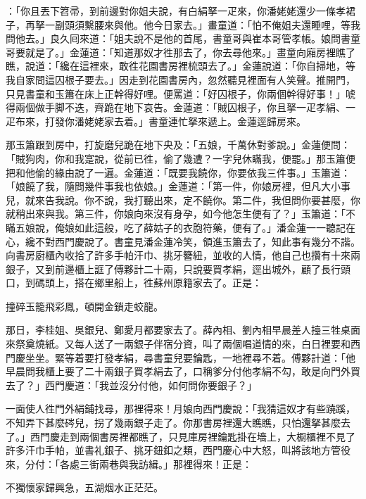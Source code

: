 ：「你且丟下笤帚，到前邊對你姐夫說，有白絹拏一疋來，你潘姥姥還少一條孝裙子，再拏一副頭須繫腰來與他。他今日家去。」畫童道：「怕不俺姐夫還睡哩，等我問他去。」良久囘來道：「姐夫說不是他的首尾，書童哥與崔本哥管孝帳。娘問書童哥要就是了。」金蓮道：「知道那奴才徃那去了，你去尋他來。」畫童向廂房裡瞧了瞧，{}說道：「纔在這裡來，敢徃花園書房裡梳頭去了。」金蓮說道：「你自掃地，等我自家問這囚根子要去。」因走到花園書房內，忽然聽見裡面有人笑聲。推開門，只見書童和玉簫在床上正幹得好哩。便罵道：「好囚根子，你兩個幹得好事！」唬得兩個做手脚不迭，齊跪在地下哀告。金蓮道：「賊囚根子，你且拏一疋孝絹、一疋布來，打發你潘姥姥家去着。」書童連忙拏來遞上。金蓮逕歸房來。

那玉簫跟到房中，打旋磨兒跪在地下央及：「五娘，千萬休對爹說。」金蓮便問：「賊狗肉，你和我寔說，從前已徃，偷了幾遭？一字兒休瞞我，便罷。」那玉簫便把和他偷的緣由說了一遍。金蓮道：「既要我饒你，你要依我三件事。」玉簫道：「娘饒了我，隨問幾件事我也依娘。」金蓮道：「第一件，你娘房裡，但凡大小事兒，就來告我說。你不說，我打聽出來，定不饒你。第二件，我但問你要甚麼，你就稍出來與我。第三件，你娘向來沒有身孕，如今他怎生便有了？」{}玉簫道：「不瞞五娘說，俺娘如此這般，吃了薛姑子的衣胞符藥，便有了。」潘金蓮一一聽記在心，纔不對西門慶說了。書童見潘金蓮冷笑，領進玉簫去了，知此事有幾分不諧。向書房廚櫃內收拾了許多手帕汗巾、挑牙簪紐，並收的人情，他自己也攢有十來兩銀子，又到前邊櫃上誆了傅夥計二十兩，只說要買孝絹，逕出城外，顧了長行頭口，到碼頭上，搭在鄉里船上，徃蘇州原籍家去了。{}正是：

撞碎玉籠飛彩鳳，頓開金鎖走蛟龍。

那日，李桂姐、吳銀兒、鄭愛月都要家去了。薛內相、劉內相早晨差人擡三牲桌面來祭奠燒紙。又每人送了一兩銀子伴宿分資，叫了兩個唱道情的來，白日裡要和西門慶坐坐。緊等着要打發孝絹，尋書童兒要鑰匙，一地裡尋不着。傅夥計道：「他早晨問我櫃上要了二十兩銀子買孝絹去了，口稱爹分付他孝絹不勾，敢是向門外買去了？」西門慶道：「我並沒分付他，如何問你要銀子？」

一面使人徃門外絹鋪找尋，那裡得來！月娘向西門慶說：「我猜這奴才有些蹺蹊，不知弄下甚麼硶兒，{}拐了幾兩銀子走了。你那書房裡還大瞧瞧，只怕還拏甚麼去了。」西門慶走到兩個書房裡都瞧了，只見庫房裡鑰匙掛在墻上，大橱櫃裡不見了許多汗巾手帕，並書礼銀子、挑牙鈕釦之類，西門慶心中大怒，叫將該地方管役來，分付：「各處三街兩巷與我訪緝。」那裡得來！正是：

不獨懷家歸興急，五湖烟水正茫茫。

